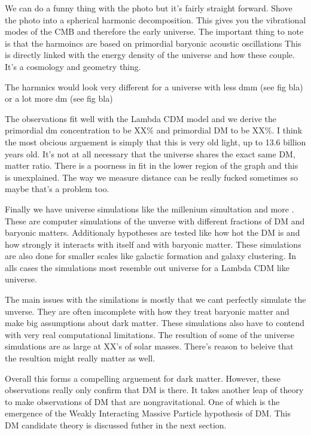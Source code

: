 
We can do a funny thing with the photo but it's fairly straight forward.
Shove the photo into a spherical harmonic decomposition.
This gives you the vibrational modes of the CMB and therefore the early universe.
The important thing to note is that the harmoincs are based on primordial baryonic acoustic oscillations \fu
This is directly linked with the energy density of the universe and how these couple.
It's a cosmology and geometry thing.


The harmnics would look very different for a universe with less dmm (see fig bla) or a lot more dm (see fig bla)


The observations fit well with the Lambda CDM model and we derive the primordial dm concentration to be XX\% and primordial DM to be XX\%.
 I think the most obcious arguement is simply that this is very old light, up to 13.6 billion years old.
It's not at all necessary that the universe shares the exact same DM, matter ratio.
There is a poorness in fit in the lower region of the graph and this is unexplained.
The way we measure distance can be really fucked sometimes so maybe that's a problem too.

Finally we have universe simulations like the millenium simultation and more \fu \ns.
These are computer simulations of the unverse with different fractions of DM and baryonic matters.
Additionaly hypotheses are tested like how hot the DM is and how strongly it interacts with itself and with baryonic matter.
These simulations are also done for smaller scales like galactic formation and galaxy clustering.
In alls cases the simulations most resemble out universe for a Lambda CDM like universe.

The main issues with the similations is mostly that we cant perfectly simulate the unverse.
They are often imcomplete with how they treat baryonic matter and make big assumptions about dark matter.
These simulations also have to contend with very real computational limitations.
The resultion of some of the universe simulations are as large at XX's of solar masses.
There's reason to beleive that the resultion might really matter as well. \ns \fu


Overall this forms a compelling arguement for dark matter.
However, these observations really only confirm that DM is there.
It takes another leap of theory to make observations of DM that are nongravitational.
One of which is the emergence of the Weakly Interacting Massive Particle hypothesis of DM.
This DM candidate theory is discussed futher in the next section.

